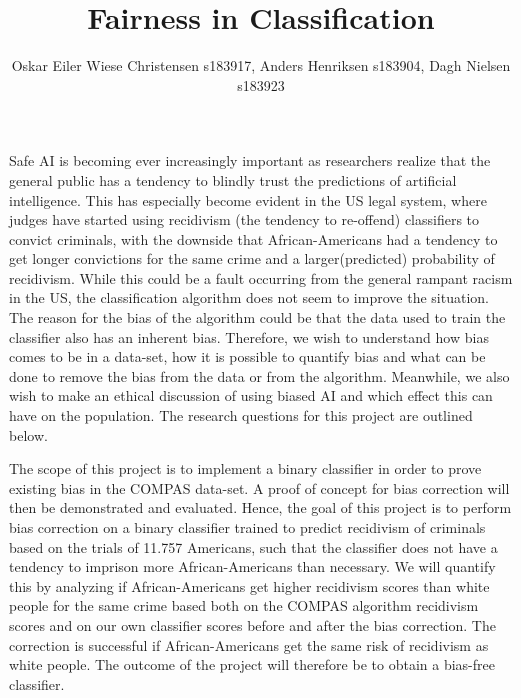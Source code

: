 \documentclass[11pt, fleqn]{article}
\title{Fairness in Classification}
\author{\small Oskar Eiler Wiese Christensen s183917, Anders Henriksen s183904, Dagh Nielsen s183923}
\date{}
\begin{document}
	\maketitle
	\vspace*{-0.65cm}	
	\noindent
	Safe AI is becoming ever increasingly important as researchers realize that the general public has a tendency to blindly trust the predictions of artificial intelligence. This has especially become evident in the US legal system, where judges have started using recidivism (the tendency to re-offend) classifiers to convict criminals, with the downside that African-Americans had a tendency to get longer convictions for the same crime and a larger(predicted) probability of recidivism. While this could be a fault occurring from the general rampant racism in the US, the classification algorithm does not seem to improve the situation. The reason for the bias of the algorithm could be that the data used to train the classifier also has an inherent bias. Therefore, we wish to understand how bias comes to be in a data-set, how it is possible to quantify bias and what can be done to remove the bias from the data or from the algorithm. Meanwhile, we also wish to make an ethical discussion of using biased AI and which effect this can have on the population. The research questions for this project are outlined below. 
	
	The scope of this project is to implement a binary classifier in order to prove existing bias in the COMPAS data-set. A proof of concept for bias correction will then be demonstrated and evaluated. Hence, the goal of this project is to perform bias correction on a binary classifier trained to predict recidivism of criminals based on the trials of 11.757 Americans, such that the classifier does not have a tendency to imprison more African-Americans than necessary. We will quantify this by analyzing if African-Americans get higher recidivism scores than white people for the same crime based both on the COMPAS algorithm recidivism scores and on our own classifier scores before and after the bias correction. The correction is successful if African-Americans get the same risk of recidivism as white people. The outcome of the project will therefore be to obtain a bias-free classifier.
	
	
\end{document}
